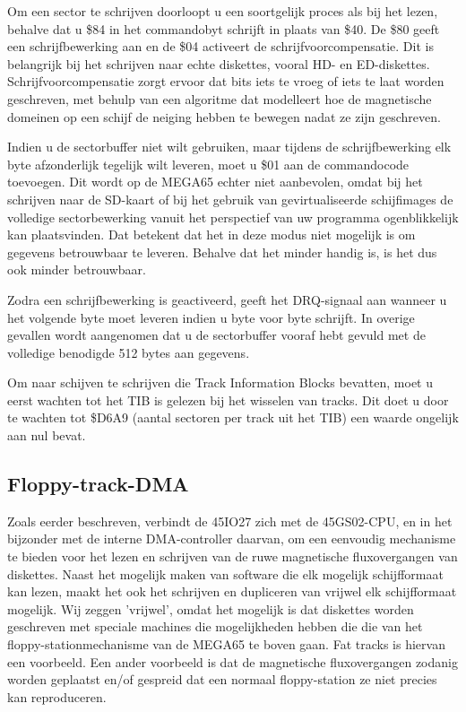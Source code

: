 Om een sector te schrijven doorloopt u een soortgelijk proces als bij het lezen, behalve dat u \$84 in het commandobyt schrijft in plaats van \$40. De \$80 geeft een schrijfbewerking aan en de \$04 activeert de schrijfvoorcompensatie. Dit is belangrijk bij het schrijven naar echte diskettes, vooral HD- en ED-diskettes. Schrijfvoorcompensatie zorgt ervoor dat bits iets te vroeg of iets te laat worden geschreven, met behulp van een algoritme dat modelleert hoe de magnetische domeinen op een schijf de neiging hebben te bewegen nadat ze zijn geschreven.

Indien u de sectorbuffer niet wilt gebruiken, maar tijdens de schrijfbewerking elk byte afzonderlijk tegelijk wilt leveren, moet u \$01 aan de commandocode toevoegen. Dit wordt op de MEGA65 echter niet aanbevolen, omdat bij het schrijven naar de SD-kaart of bij het gebruik van gevirtualiseerde schijfimages de volledige sectorbewerking vanuit het perspectief van uw programma ogenblikkelijk kan plaatsvinden. Dat betekent dat het in deze modus niet mogelijk is om gegevens betrouwbaar te leveren. Behalve dat het minder handig is, is het dus ook minder betrouwbaar.

Zodra een schrijfbewerking is geactiveerd, geeft het DRQ-signaal aan wanneer u het volgende byte moet leveren indien u byte voor byte schrijft. In overige gevallen wordt aangenomen dat u de sectorbuffer vooraf hebt gevuld met de volledige benodigde 512 bytes aan gegevens.

Om naar schijven te schrijven die Track Information Blocks bevatten, moet u eerst wachten tot het TIB is gelezen bij het wisselen van tracks. Dit doet u door te wachten tot \$D6A9 (aantal sectoren per track uit het TIB) een waarde ongelijk aan nul bevat.

\subsection{Floppy-track-DMA}

Zoals eerder beschreven, verbindt de 45IO27 zich met de 45GS02-CPU, en in het bijzonder met de interne DMA-controller daarvan, om een eenvoudig mechanisme te bieden voor het lezen en schrijven van de ruwe magnetische fluxovergangen van diskettes. Naast het mogelijk maken van software die elk mogelijk schijfformaat kan lezen, maakt het ook het schrijven en dupliceren van vrijwel elk schijfformaat mogelijk. Wij zeggen 'vrijwel', omdat het mogelijk is dat diskettes worden geschreven met speciale machines die mogelijkheden hebben die die van het floppy-stationmechanisme van de MEGA65 te boven gaan. Fat tracks is hiervan een voorbeeld. Een ander voorbeeld is dat de magnetische fluxovergangen zodanig worden geplaatst en/of gespreid dat een normaal floppy-station ze niet precies kan reproduceren.

